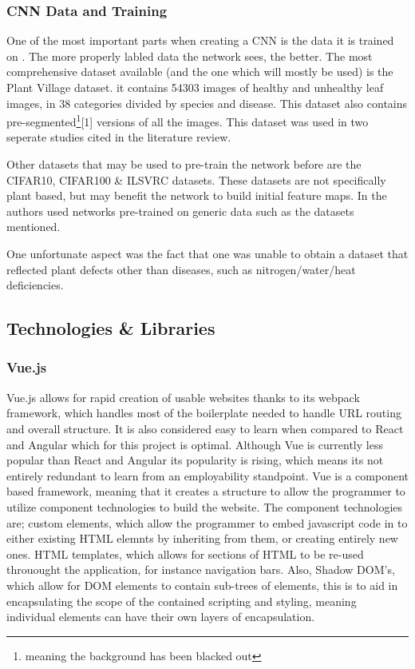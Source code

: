     \subsubsection{CNN Data and Training}
      One of the most important parts when creating a CNN is the data it is trained on \citep{Halevy2009}. The more properly labled data the network sees, the better. The most comprehensive dataset available (and the one which will mostly be used) is the Plant Village dataset. it contains 54303 images of healthy and unhealthy leaf images, in 38 categories divided by species and disease. This dataset also contains pre-segmented\footnote{meaning the background has been blacked out}[1] versions of all the images. This dataset was used in two seperate studies cited in the literature review.
      \par
      Other datasets that may be used to pre-train the network before are the CIFAR10, CIFAR100 \& ILSVRC datasets. These datasets are not specifically plant based, but may benefit the network to build initial feature maps. In \citep{Choi} the authors used networks pre-trained on generic data such as the datasets mentioned.
      \par
      One unfortunate aspect was the fact that one was unable to obtain a dataset that reflected plant defects other than diseases, such as nitrogen/water/heat deficiencies.


\subsection{Technologies \& Libraries}
  \subsubsection{Vue.js}
    Vue.js allows for rapid creation of usable websites thanks to its webpack framework, which handles most of the boilerplate needed to handle URL routing and overall structure. It is also considered easy to learn when compared to React and Angular \citep{StudiengangBachelor} which for this project is optimal. Although Vue is currently less popular than React and Angular its popularity is rising, which means its not entirely redundant to learn from an employability standpoint. Vue is a component based framework, meaning that it creates a structure to allow the programmer to utilize component technologies to build the website. The component technologies are; custom elements, which allow the programmer to embed javascript code in to either existing HTML elemnts by inheriting from them, or creating entirely new ones. HTML templates, which allows for sections of HTML to be re-used throuought the application, for instance navigation bars. Also, Shadow DOM's, which allow for DOM elements to contain sub-trees of elements, this is to aid in encapsulating the scope of the contained scripting and styling, meaning individual elements can have their own layers of encapsulation.
